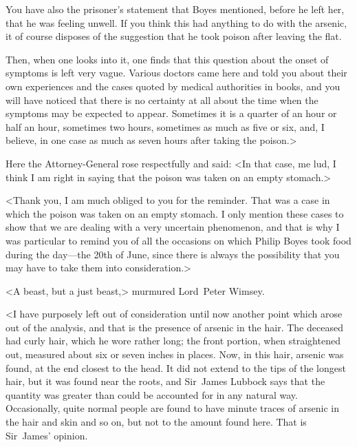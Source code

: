 You have also the prisoner's statement that Boyes mentioned, before he left her, that he was feeling unwell. If you think this had anything to do with the arsenic, it of course disposes of the suggestion that he took poison after leaving the flat.

Then, when one looks into it, one finds that this question about the onset of symptoms is left very vague. Various doctors came here and told you about their own experiences and the cases quoted by medical authorities in books, and you will have noticed that there is no certainty at all about the time when the symptoms may be expected to appear. Sometimes it is a quarter of an hour or half an hour, sometimes two hours, sometimes as much as five or six, and, I believe, in one case as much as seven hours after taking the poison.>

Here the Attorney-General rose respectfully and said: <In that case, me lud, I think I am right in saying that the poison was taken on an empty stomach.>

<Thank you, I am much obliged to you for the reminder. That was a case in which the poison was taken on an empty stomach. I only mention these cases to show that we are dealing with a very uncertain phenomenon, and that is why I was particular to remind you of all the occasions on which Philip Boyes took food during the day—the 20th of June, since there is always the possibility that you may have to take them into consideration.>

<A beast, but a just beast,> murmured Lord~Peter Wimsey.

<I have purposely left out of consideration until now another point which arose out of the analysis, and that is the presence of arsenic in the hair. The deceased had curly hair, which he wore rather long; the front portion, when straightened out, measured about six or seven inches in places. Now, in this hair, arsenic was found, at the end closest to the head. It did not extend to the tips of the longest hair, but it was found near the roots, and Sir~James Lubbock says that the quantity was greater than could be accounted for in any natural way. Occasionally, quite normal people are found to have minute traces of arsenic in the hair and skin and so on, but not to the amount found here. That is Sir~James' opinion.


